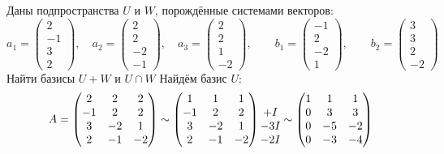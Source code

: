 Даны подпространства $ U $ и $ W $, порождённые системами векторов:
$$ a_1 =
\begin{pmatrix}
	2 \\
    -1 \\
    3 \\
    2
\end{pmatrix}, \quad a_2 =
\begin{pmatrix}
	2 \\
    2 \\
    -2 \\
    -1
\end{pmatrix}, \quad a_3 =
\begin{pmatrix}
	2 \\
    2 \\
    1 \\
    -2
\end{pmatrix}, \qquad b_1 =
\begin{pmatrix}
	-1 \\
    2 \\
    -2 \\
    1
\end{pmatrix}, \qquad b_2 =
\begin{pmatrix}
	3 \\
    3 \\
    2 \\
    -2
\end{pmatrix} $$
Найти базисы $ U + W $ и $ U \cap W $
Найдём базис $ U $:
$$ A =
\begin{pmatrix}
	2 & 2 & 2 \\
    -1 & 2 & 2 \\
    3 & -2 & 1 \\
    2 & -1 & -2
\end{pmatrix} \sim
\begin{pmatrix}
	1 & 1 & 1 \\
    -1 & 2 & 2 \\
    3 & -2 & 1 \\
    2 & -1 & -2
\end{pmatrix}
\begin{matrix}
	\ \\
    +\rom1 \\
    -3\rom1 \\
    -2\rom1
\end{matrix} \sim
\begin{pmatrix}
	1 & 1 & 1 \\
    0 & 3 & 3 \\
    0 & -5 & -2 \\
    0 & -3 & -4
\end{pmatrix} $$
